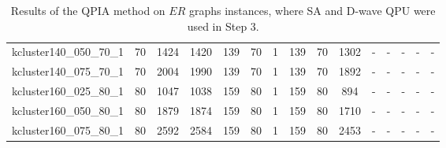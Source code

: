 \documentclass{article}
\begin{document}
\begin{landscape}
\begin{table}[]
{\begin{tabular}{l|cccc|ccccc|ccccc}
kcluster140\_050\_70\_1 & 70 & 1424 & 1420 & 139 & 70 & 1 & 139 & 70 & 1302 & - & - & - & - & - \\
kcluster140\_075\_70\_1 & 70 & 2004 & 1990 & 139 & 70 & 1 & 139 & 70 & 1892 & - & - & - & - & - \\
kcluster160\_025\_80\_1 & 80 & 1047 & 1038 & 159 & 80 & 1 & 159 & 80 & 894 & - & - & - & - & - \\
kcluster160\_050\_80\_1 & 80 & 1879 & 1874 & 159 & 80 & 1 & 159 & 80 & 1710 & - & - & - & - & - \\
kcluster160\_075\_80\_1 & 80 & 2592 & 2584 & 159 & 80 & 1 & 159 & 80 & 2453 & - & - & - & - & - \\
\hline
\end{tabular}
    }
    \caption{Results of the QPIA method on $ER$ graphs instances, where  SA and D-wave QPU were used in Step 3.}
    \label{tab: QPIA_ER_ins}
\end{table}

\begin{table}[]
    \centering
    \caption{Results of the QPIA method on $DW$ graphs instances, where  SA and D-wave QPU were used in Step 3.}
    \label{tab: QPIA_DW_ins}
\end{table}

\end{landscape}
\end{document}
